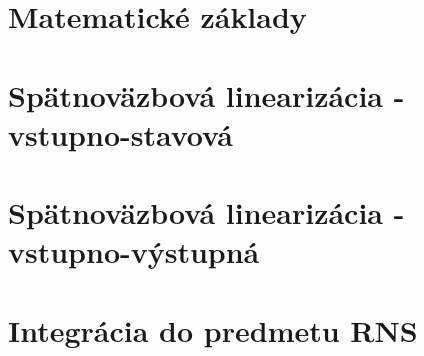 \newpage
{}
{
	\section{Matematické základy}\label{sec:matematicke_zaklady}
	

    \newpage
    \clearpage 
	\section{Spätnoväzbová linearizácia - vstupno-stavová}\label{sec:vsl}
 	
 	

    \newpage
    \clearpage 
	\section{Spätnoväzbová linearizácia - vstupno-výstupná}\label{sec:vvl}
 	
 	

    \newpage
    \clearpage 
    \section{Integrácia do predmetu RNS}\label{sec:integracia}
 	
}
{
}


